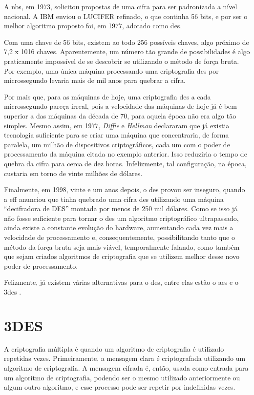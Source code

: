 A \acrfull{nbs}, em 1973, solicitou propostas de uma cifra para ser padronizada a nível nacional. A IBM enviou o LUCIFER refinado, o que continha 56 bits, e por ser o melhor algoritmo proposto foi, em 1977, adotado como \acrfull{des}.

Com uma chave de 56 bits, existem ao todo 256 possíveis chaves, algo próximo de 7,2 x 1016 chaves. Aparentemente, um número tão grande de possibilidades é algo praticamente impossível de se descobrir se utilizando o método de força bruta. Por exemplo, uma única máquina processando uma criptografia \acrshort{des} por microssegundo levaria mais de mil anos para quebrar a cifra.

Por mais que, para as máquinas de hoje, uma criptografia \acrshort{des} a cada microssegundo pareça irreal, pois a velocidade das máquinas de hoje já é bem superior a das máquinas da década de 70, para aquela época não era algo tão simples. Mesmo assim, em 1977, \textit{Diffie} e \textit{Hellman} declararam que já existia tecnologia suficiente para se criar uma máquina que concentraria, de forma paralela, um milhão de dispositivos criptográficos, cada um com o poder de processamento da máquina citada no exemplo anterior. Isso reduziria o tempo de quebra da cifra para cerca de dez horas. Infelizmente, tal configuração, na época, custaria em torno de vinte milhões de dólares.

Finalmente, em 1998, vinte e um anos depois, o \acrshort{des} provou ser inseguro, quando a \acrfull{eff} anunciou que tinha quebrado uma cifra \acrshort{des} utilizando uma máquina “decifradora de DES” montada por menos de 250 mil dólares. Como se isso já não fosse suficiente para tornar o \acrshort{des} um algoritmo criptográfico ultrapassado, ainda existe a constante evolução do hardware, aumentando cada vez mais a velocidade de processamento e, consequentemente, possibilitando tanto que o método da força bruta seja mais viável, temporalmente falando, como também que sejam criados algoritmos de criptografia que se utilizem melhor desse novo poder de processamento.

Felizmente, já existem várias alternativas para o \acrshort{des}, entre elas estão o \acrfull{aes} e o \acrfull{3des} \cite{stallings14} \cite{tanenbaum03}.

\section{3DES}
\label{sec:3des}
A criptografia múltipla é quando um algoritmo de criptografia é utilizado repetidas vezes. Primeiramente, a mensagem clara é criptografada utilizando um algoritmo de criptografia. A mensagem cifrada é, então, usada como entrada para um algoritmo de criptografia, podendo ser o mesmo utilizado anteriormente ou algum outro algoritmo, e esse processo pode ser repetir por indefinidas vezes.

